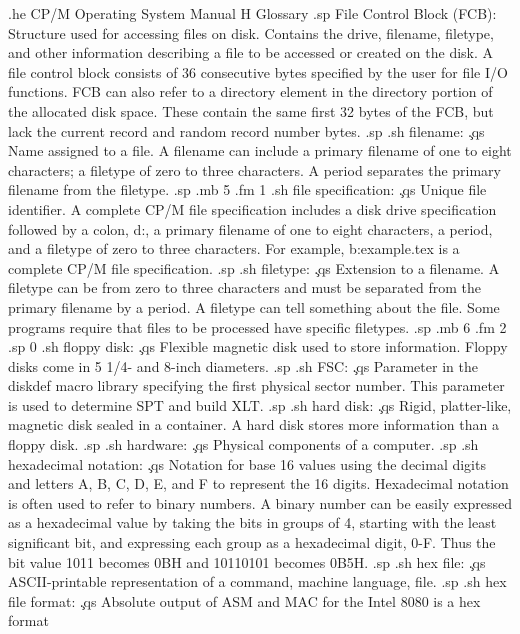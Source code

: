 .he CP/M Operating System Manual                          H  Glossary
.sp
File Control Block (FCB):  
Structure used for accessing files on disk.  Contains the drive, 
filename, filetype, and other information describing a file to be 
accessed or created on the disk.  A file control block consists 
of 36 consecutive bytes specified by the user for file I/O 
functions.  FCB can also refer to a directory element in the 
directory portion of the allocated disk space.  These contain the 
same first 32 bytes of the FCB, but lack the current record and 
random record number bytes.
.sp
.sh
filename:  \c
.qs
Name assigned to a file.  A filename can include a primary 
filename of one to eight characters; a filetype of zero to three characters.  
A period separates the primary filename from the filetype.
.sp
.mb 5
.fm 1
.sh
file specification:  \c
.qs
Unique file identifier.  A complete CP/M file specification 
includes a disk drive specification followed by a colon, d:, a 
primary filename of one to eight characters, a period, and a filetype of 
zero to three characters.  For example, b:example.tex is a complete CP/M 
file specification.
.sp
.sh
filetype:  \c
.qs
Extension to a filename.  A filetype can be from zero to three 
characters and must be separated from the primary filename by a 
period.  A filetype can tell something about the file.  Some 
programs require that files to be processed have specific 
filetypes.
.sp
.mb 6
.fm 2
.sp 0
.sh
floppy disk:  \c
.qs
Flexible magnetic disk used to store information.  Floppy disks 
come in 5 1/4- and 8-inch diameters.
.sp
.sh
FSC:  \c
.qs
Parameter in the diskdef macro library specifying the first 
physical sector number.  This parameter is used to determine SPT 
and build XLT.
.sp
.sh
hard disk:  \c
.qs
Rigid, platter-like, magnetic disk sealed in a container.  A hard 
disk stores more information than a floppy disk.
.sp
.sh
hardware:  \c
.qs
Physical components of a computer.
.sp
.sh
hexadecimal notation:  \c
.qs
Notation for base 16 values using the decimal digits and letters 
A, B, C, D, E, and F to represent the 16 digits.  Hexadecimal 
notation is often used to refer to binary numbers.  A binary 
number can be easily expressed as a hexadecimal value by taking 
the bits in groups of 4, starting with the least significant bit, 
and expressing each group as a hexadecimal digit, 0-F.  Thus the 
bit value 1011 becomes 0BH and 10110101 becomes 0B5H.
.sp
.sh
hex file:  \c
.qs
ASCII-printable representation of a command, machine language, 
file.
.sp
.sh
hex file format:  \c
.qs
Absolute output of ASM and MAC for the Intel 8080 is a hex format 

